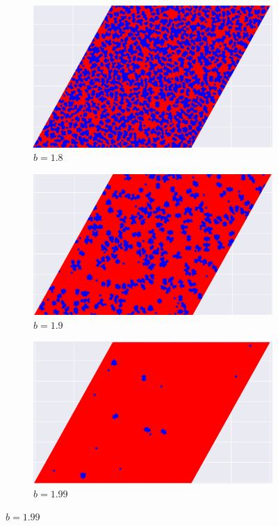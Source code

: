 \documentclass[12pt]{article}
\begin{document}
\begin{figure}[!htbp]
            \begin{subfigure}{.33\textwidth}
            \centering
            \includegraphics[width=.9\linewidth]{TriangularMeanFieldGame/triangular_snapshot_b=18.jpg}
            \caption{$b=1.8$}
            \label{fig:trsub7}
            \end{subfigure}%
            \begin{subfigure}{.33\textwidth}
            \centering
            \includegraphics[width=.9\linewidth]{TriangularMeanFieldGame/triangular_snapshot_b=19.jpg}
            \caption{$b=1.9$}
            \label{fig:trsub8}
            \end{subfigure}%
            \begin{subfigure}{.33\textwidth}
            \centering
            \includegraphics[width=.9\linewidth]{TriangularMeanFieldGame/triangular_snapshot_b=199.jpg}
            \caption{$b=1.99$}
            \label{fig:trsub9}
            \end{subfigure}
        

\end{figure}
\end{document}
